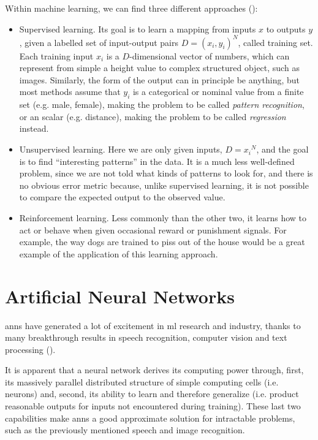 Within machine learning, we can find three different approaches (\cite{kevin_p_murphy_book}):
\begin{itemize}
	\item Supervised learning. Its goal is to learn a mapping from inputs $x$ to outputs $y$, given a labelled set of input-output pairs $D={(x_i ,y_i)}^N$, called training set. Each training input $x_i$ is a $D$-dimensional vector of numbers, which can represent from simple a height value to complex structured object, such as images. Similarly, the form of the output can in principle be anything, but most methods assume that $y_i$ is a categorical or nominal value from a finite set (e.g. male, female), making the problem to be called \textit{pattern recognition}, or an scalar (e.g. distance), making the problem to be called \textit{regression} instead.  

	\item Unsupervised learning. Here we are only given inputs, $D={x_i}^N$, and the goal is to find “interesting patterns” in the data. It is a much less well-defined problem, since we are not told what kinds of patterns to look for, and there is no obvious error metric because, unlike supervised learning, it is not possible to compare the expected output to the observed value. 

	\item Reinforcement learning. Less commonly than the other two, it learns how to act or behave when given occasional reward or punishment signals. For example, the way dogs are trained to piss out of the house would be a great example of the application of this learning approach.  
\end{itemize}

\section{Artificial Neural Networks}
\glspl{ann} have generated a lot of excitement in \gls{ml} research and industry, thanks to many breakthrough results in speech recognition, computer vision and text processing (\cite{intro_ann}). 

It is apparent that a neural network derives its computing power through, first, its massively parallel distributed structure of simple computing cells (i.e. neurons) and, second, its ability to learn and therefore generalize (i.e. product reasonable outputs for inputs not encountered during training). These last two capabilities make \glspl{ann} a good approximate solution for intractable problems, such as the previously mentioned speech and image recognition.

